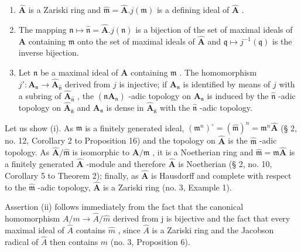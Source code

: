 \begin{enumerate}
\def\labelenumi{(\roman{enumi})}
\item
  \(\hat{\mathbf{A}}\) is a Zariski ring and \(\hat{\mathfrak{m}} = \hat{\mathbf{A}}.j(\mathfrak{m})\) is a defining ideal of \(\hat{\mathbf{A}}\) .
\item
  The mapping \(\mathfrak{n} \mapsto \hat{\mathfrak{n}} = \hat{\mathbf{A}}.j(\mathfrak{n})\) is a bijection of the set of maximal ideals of \(\mathbf{A}\) containing \(\mathfrak{m}\) onto the set of maximal ideals of \(\hat{\mathbf{A}}\) and \(\mathfrak{q} \mapsto j^{-1}(\mathfrak{q})\) is the inverse bijection.
\item
  Let \(\mathfrak{n}\) be a maximal ideal of \(\mathbf{A}\) containing \(\mathfrak{m}\) . The homomorphism \(j': \mathbf{A}_{\mathfrak{n}} \to \hat{\mathbf{A}}_{\hat{\mathfrak{n}}}\) derived from \(j\) is injective; if \(\mathbf{A}_{\mathfrak{n}}\) is identified by means of \(j\) with a subring of \(\hat{\mathbf{A}}_{\hat{\mathfrak{n}}}\) , the \((\mathfrak{n}\mathbf{A}_{\mathfrak{n}})\) -adic topology on \(\mathbf{A}_{\mathfrak{n}}\) is induced by the \(\hat{\mathfrak{n}}\) -adic topology on \(\hat{\mathbf{A}}_{\hat{\mathfrak{n}}}\) and \(\mathbf{A}_{\mathfrak{n}}\) is dense in \(\hat{\mathbf{A}}_{\hat{\mathfrak{n}}}\) with the \(\hat{\mathfrak{n}}\) -adic topology.
\end{enumerate}

Let us show (i). As \(\mathfrak{m}\) is a finitely generated ideal, \((\mathfrak{m}^n)^{\circ} = (\hat{\mathfrak{m}})^n = \mathfrak{m}^n\hat{\mathbf{A}}\) (§ 2, no. 12, Corollary 2 to Proposition 16) and the topology on \(\hat{\mathbf{A}}\) is the \(\hat{\mathfrak{m}}\) -adic topology. As \(\hat{\mathbf{A}}/\hat{\mathfrak{m}}\) is isomorphic to \(\mathbf{A}/\mathfrak{m}\) , it is a Noetherian ring and \(\hat{\mathfrak{m}} = \mathfrak{m}\hat{\mathbf{A}}\) is a finitely generated \(\hat{\mathbf{A}}\) -module and therefore \(\hat{\mathbf{A}}\) is Noetherian (§ 2, no. 10, Corollary 5 to Theorem 2); finally, as \(\hat{\mathbf{A}}\) is Hausdorff and complete with respect to the \(\hat{\mathfrak{m}}\) -adic topology, \(\hat{\mathbf{A}}\) is a Zariski ring (no. 3, Example 1).

Assertion (ii) follows immediately from the fact that the canonical homomorphism \(A/m \rightarrow \hat{A}/\hat{m}\) derived from j is bijective and the fact that every maximal ideal of \(\hat{A}\) contains \(\hat{m}\) , since \(\hat{A}\) is a Zariski ring and the Jacobson radical of \(\hat{A}\) then contains \(\hat{m}\) (no. 3, Proposition 6).

